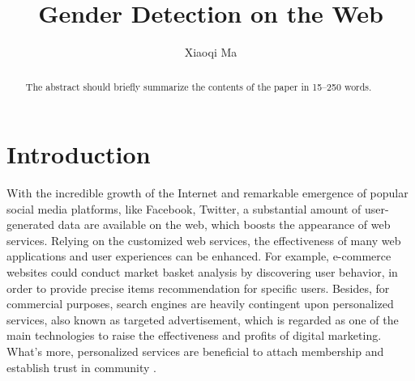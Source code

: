\documentclass[runningheads]{llncs}
\begin{document}
	\title{Gender Detection on the Web}
	\author{Xiaoqi Ma}
	\maketitle  

	\begin{abstract}
		The abstract should briefly summarize the contents of the paper in
		15--250 words.
		
	\end{abstract}

	\section{Introduction}
	
	With the incredible growth of the Internet and remarkable emergence of popular social media platforms, like Facebook, Twitter, a substantial amount of user-generated data are available on the web, which boosts the appearance of web services. Relying on the customized web services, the effectiveness of many web applications and user experiences can be enhanced. For example, e-commerce websites could conduct market basket analysis by discovering user behavior, in order to provide precise items recommendation for specific users. Besides, for commercial purposes, search engines are heavily contingent upon personalized services, also known as targeted advertisement, which is regarded as one of the main technologies to raise the effectiveness and profits of digital marketing. What’s more, personalized services are beneficial to attach membership and establish trust in community \cite{zhong2015you}.\\
	
\end{document}
